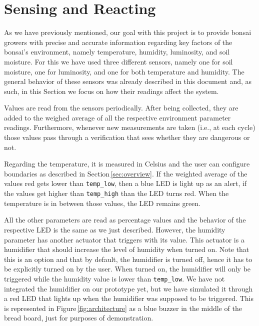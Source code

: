 \documentclass{article}
\begin{document}
\section{Sensing and Reacting}\label{sec:sensors_actuators}

As we have previously mentioned, our goal with this project is to provide bonsai
growers with precise and accurate information regarding key factors of the
bonsai's environment, namely temperature, humidity, luminosity, and soil
moisture. For this we have used three different sensors, namely one for soil
moisture, one for luminosity, and one for both temperature and humidity. The
general behavior of these sensors was already described in this document and, as
such, in this Section we focus on how their readings affect the system.

Values are read from the sensors periodically. After being collected, they are
added to the weighed average of all the respective environment parameter
readings. Furthermore, whenever new measurements are taken (i.e., at each cycle)
those values pass through a verification that sees whether they are dangerous or
not.

Regarding the temperature, it is measured in Celsius and the user can configure
boundaries as described in Section\,\ref{sec:overview}. If the weighted average
of the values red gets lower than \texttt{temp\_low}, then a blue LED is light
up as an alert, if the values get higher than \texttt{temp\_high} than the LED
turns red. When the temperature is in between those values, the LED remains
green.

All the other parameters are read as percentage values and the behavior of the
respective LED is the same as we just described. However, the humidity parameter
has another actuator that triggers with its value. This actuator is a humidifier
that should increase the level of humidity when turned on. Note that this is an
option and that by default, the humidifier is turned off, hence it has to be
explicitly turned on by the user. When turned on, the humidifier will only be
triggered while the humidity value is lower than \texttt{temp\_low}. We have not
integrated the humidifier on our prototype yet, but we have simulated it through
a red LED that lights up when the humidifier was supposed to be triggered. This
is represented in Figure\,\ref{fig:architecture} as a blue buzzer in the middle
of the bread board, just for purposes of demonstration.
\end{document}
